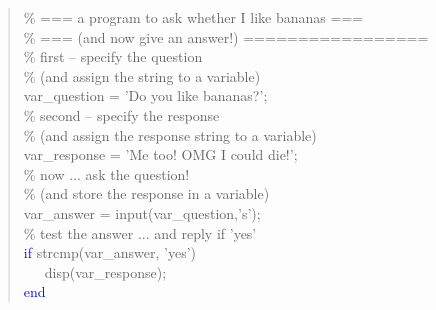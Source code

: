 \documentclass{tufte-book} %
\newenvironment{docspec}{\begin{quotation}\ttfamily\parskip0pt\parindent0pt\ignorespaces}{\end{quotation}}
\begin{document}
\begin{docspec}
\textcolor[rgb]{0,0.501961,0}{\% === a program to ask whether I like bananas ===
\\\% === (and now give an answer!) =================
\\\% first -- specify the question 
\\\% (and assign the string to a variable)}
\\var\_question = \textcolor[rgb]{1,0,1}{'Do you like bananas?'};
\textcolor[rgb]{0,0.501961,0}{\\\% second -- specify the response 
\\\% (and assign the response string to a variable)}
\\var\_response = \textcolor[rgb]{1,0,1}{'Me too! OMG I could die!'};
\textcolor[rgb]{0,0.501961,0}{\\\% now ... ask the question!
\\\% (and store the response in a variable)}
\\var\_answer = input(var\_question,\textcolor[rgb]{1,0,1}{'s'});
\textcolor[rgb]{0,0.501961,0}{\\\% test the answer ... and reply if 'yes'}
\\\textcolor{blue}{if} strcmp(var\_answer, \textcolor[rgb]{1,0,1}{'yes'})
\\ \ \ \ disp(var\_response);
\\\textcolor{blue}{end}
\end{docspec}
\end{document}
